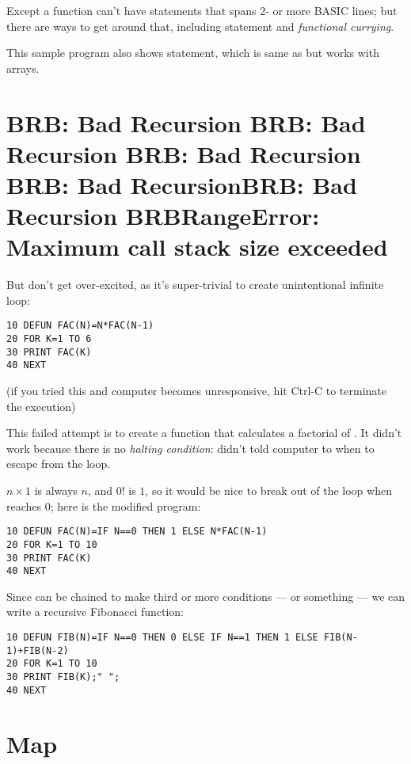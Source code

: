 Except a function can't have statements that spans 2- or more BASIC lines; but there are ways to get around that, including  statement and \emph{functional currying}.

This sample program also shows  statement, which is same as  but works with arrays.

\section[Recursion]{BRB: Bad Recursion BRB: Bad Recursion BRB: Bad Recursion BRB: Bad RecursionBRB: Bad Recursion BRBRangeError: Maximum call stack size exceeded}

But don't get over-excited, as it's super-trivial to create unintentional infinite loop:

\begin{lstlisting}
10 DEFUN FAC(N)=N*FAC(N-1)
20 FOR K=1 TO 6
30 PRINT FAC(K)
40 NEXT
\end{lstlisting}

(if you tried this and computer becomes unresponsive, hit Ctrl-C to terminate the execution)

This failed attempt is to create a function that calculates a factorial of . It didn't work because there is no \emph{halting condition}: didn't told computer to when to escape from the loop.

$n \times 1$ is always $n$, and $0!$ is $1$, so it would be nice to break out of the loop when  reaches $0$; here is the modified program:

\begin{lstlisting}
10 DEFUN FAC(N)=IF N==0 THEN 1 ELSE N*FAC(N-1)
20 FOR K=1 TO 10
30 PRINT FAC(K)
40 NEXT
\end{lstlisting}

Since  can be chained to make third or more conditions ---  or something --- we can write a recursive Fibonacci function:

\begin{lstlisting}
10 DEFUN FIB(N)=IF N==0 THEN 0 ELSE IF N==1 THEN 1 ELSE FIB(N-1)+FIB(N-2)
20 FOR K=1 TO 10
30 PRINT FIB(K);" ";
40 NEXT
\end{lstlisting}

\section[MAPping]{Map}

